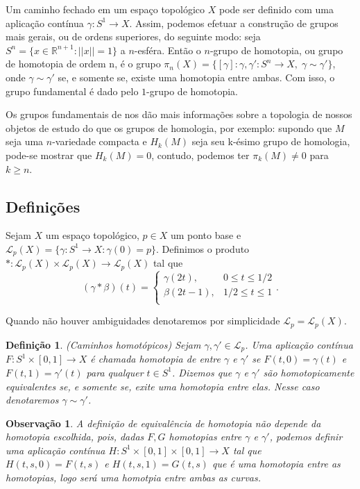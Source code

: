 \documentclass[12pt]{book}
\newtheorem{definicao}[teorema]{Definição}
\newtheorem{observacao}[teorema]{Observação}
\newcommand{\caminhospontobase}[1]{\mathcal{L}_{#1}}
\newcommand{\caminhospontobasegeral}[2]{\mathcal{L}_{#1}(#2)}
\newcommand{\circulo}{S^{1}}
\newcommand{\classe}[1]{[#1]}
\newcommand{\funcaocond}[5]{
	#1 = 
	\left\{
	\begin{array}{cc}
		#2, & #3\\
		#4, & #5\\
	\end{array}
	\right.
}
\newcommand{\homologia}[2]{H_{#1}(#2)}
\newcommand{\norma}[1]{||#1||}
\newcommand{\real}[1]{\mathbb{R}^{#1}}
\begin{document}
	Um caminho fechado em um espaço topológico $X$ pode ser definido com uma aplicação contínua $\gamma:\circulo\to X$. Assim, podemos efetuar a construção de grupos mais gerais, ou de ordens superiores, do seguinte modo: seja $S^{n}= \{x \in \real{n+1}: \norma{x}=1\}$ a $n$-esféra. Então o $n$-grupo de homotopia, ou grupo de homotopia de ordem n, é o grupo $\pi_{n}(X) = \{\classe{\gamma}: \gamma,\gamma':S^{n}\to X,\; \gamma \sim \gamma'\}$, onde $\gamma \sim \gamma'$ se, e somente se, existe uma homotopia entre ambas. Com isso, o grupo fundamental é dado pelo $1$-grupo de homotopia.
	
	Os grupos fundamentais de nos dão mais informações sobre a topologia de nossos objetos de estudo do que os grupos de homologia, por exemplo: supondo que $M$ seja uma $n$-variedade compacta e $H_{k}(M)$ seja seu k-ésimo grupo de homologia, pode-se mostrar que $\homologia{k}{M} = 0$, contudo, podemos ter $\pi_{k}(M)\neq 0$ para $k\geq n$.
	
	\subsection{Definições}
	
	Sejam $X$ um espaço topológico, $p \in X$ um ponto base e $\caminhospontobasegeral{p}{X}=\{\gamma:\circulo\to X: \gamma(0) = p\}$. Definimos o produto $*:\caminhospontobasegeral{p}{X}\times \caminhospontobasegeral{p}{X} \to \caminhospontobasegeral{p}{X}$ tal que
	$$
		\funcaocond{(\gamma*\beta)(t)}{\gamma(2t)}{0\leq t \leq 1/2}{\beta(2t-1)}{1/2 \leq t \leq 1}.
	$$
	
	Quando não houver ambiguidades denotaremos por simplicidade $\caminhospontobase{p}=\caminhospontobasegeral{p}{X}$.
	
	\begin{definicao}\label{definicao_caminhos_homotopicos}
		(Caminhos homotópicos) Sejam $\gamma, \gamma' \in \caminhospontobase{p}$. Uma aplicação contínua $F:\circulo \times [0,1] \to X$ é chamada homotopia de entre $\gamma$ e $\gamma'$ se $F(t, 0) = \gamma(t)$ e $F(t, 1) = \gamma'(t)$ para qualquer $t\in \circulo$. Dizemos que  $\gamma$ e $\gamma'$ são homotopicamente equivalentes se, e somente se, exite uma homotopia entre elas. Nesse caso denotaremos $\gamma \sim \gamma'$. 
	\end{definicao}
	
	\begin{observacao}
		A definição de equivalência de homotopia não depende da homotopia escolhida, pois, dadas $F,G$ homotopias entre $\gamma$ e $\gamma'$, podemos definir uma aplicação contínua $H: \circulo \times [0,1] \times [0,1] \to X$ tal que $H(t,s ,0) = F(t,s)$ e $H(t,s, 1) = G(t,s)$ que é uma homotopia entre as homotopias, logo será uma homotpia entre ambas as curvas.
	\end{observacao}
	
\end{document}
